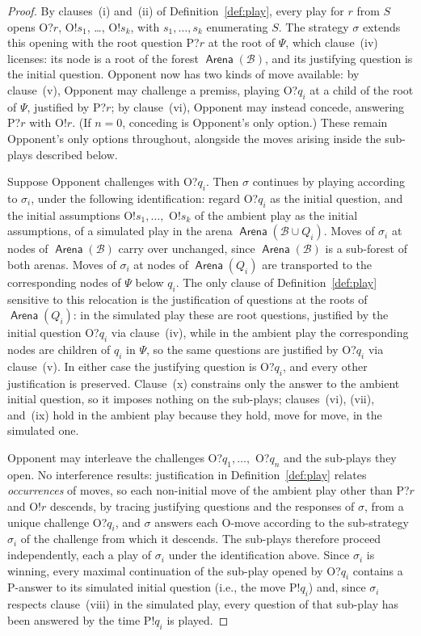 \documentclass[10pt,a4paper]{amsart}
\newcommand{\base}[1]{\mathcal{#1}}                    %
\newcommand{\toarena}[1]{\mathrel{\textsf{Arena}}(#1)}           %
\begin{document}
\begin{proof}
By clauses~(i) and~(ii) of Definition~\ref{def:play}, every play for $r$ from
$S$ opens O?$r$, O!$s_1$, \ldots, O!$s_k$, with $s_1, \ldots, s_k$
enumerating $S$. The strategy $\sigma$ extends this opening with the root
question P?$r$ at the root of $\Psi$, which clause~(iv) licenses: its node is
a root of the forest $\toarena{\base{B}}$, and its justifying question is the
initial question. Opponent now has two kinds of move available: by
clause~(v), Opponent may challenge a premiss, playing O?$q_i$ at a child of
the root of $\Psi$, justified by P?$r$; by clause~(vi), Opponent may instead
concede, answering P?$r$ with O!$r$. (If $n = 0$, conceding is Opponent's
only option.) These remain Opponent's only options throughout, alongside the
moves arising inside the sub-plays described below.
 
Suppose Opponent challenges with O?$q_i$. Then $\sigma$ continues by playing
according to $\sigma_i$, under the following identification: regard O?$q_i$
as the initial question, and the initial assumptions
O!$s_1, \ldots,$ O!$s_k$ of the ambient play as the initial assumptions, of a
simulated play in the arena $\toarena{\base{B} \cup Q_i}$. Moves of
$\sigma_i$ at nodes of $\toarena{\base{B}}$ carry over unchanged, since
$\toarena{\base{B}}$ is a sub-forest of both arenas. Moves of $\sigma_i$ at
nodes of $\toarena{Q_i}$ are transported to the corresponding nodes of $\Psi$
below $q_i$. The only clause of Definition~\ref{def:play} sensitive to this
relocation is the justification of questions at the roots of
$\toarena{Q_i}$: in the simulated play these are root questions, justified by
the initial question O?$q_i$ via clause~(iv), while in the ambient play the
corresponding nodes are children of $q_i$ in $\Psi$, so the same questions
are justified by O?$q_i$ via clause~(v). In either case the justifying
question is O?$q_i$, and every other justification is preserved. Clause~(x)
constrains only the answer to the ambient initial question, so it imposes
nothing on the sub-plays; clauses~(vi), (vii), and~(ix) hold in the ambient
play because they hold, move for move, in the simulated one.
 
Opponent may interleave the challenges O?$q_1, \ldots,$ O?$q_n$ and the
sub-plays they open. No interference results: justification in
Definition~\ref{def:play} relates \emph{occurrences} of moves, so each
non-initial move of the ambient play other than P?$r$ and O!$r$ descends, by
tracing justifying questions and the responses of $\sigma$, from a unique
challenge O?$q_i$, and $\sigma$ answers each O-move according to the
sub-strategy $\sigma_i$ of the challenge from which it descends. The
sub-plays therefore proceed independently, each a play of $\sigma_i$ under
the identification above. Since $\sigma_i$ is winning, every maximal
continuation of the sub-play opened by O?$q_i$ contains a P-answer to its
simulated initial question
(i.e., the move P!$q_i$)
and, since
$\sigma_i$ respects clause~(viii) in the simulated play, every question of
that sub-play has been answered by the time P!$q_i$ is played.
 

\end{proof}
\end{document}
